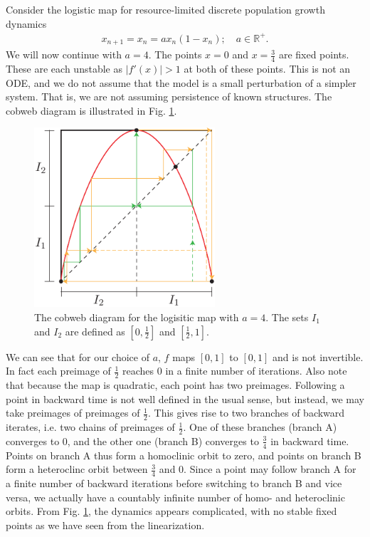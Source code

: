  \begin{ex}
 	Consider the logistic map for resource-limited discrete population growth dynamics
	\begin{align}
		x_{n+1}=x_{n}= ax_n(1-x_n);\quad a \in \mathbb{R}^{+}.
	\end{align}
	We will now continue with $a=4$. The points $x=0$ and $x=\frac{3}{4}$ are fixed points. These are each unstable as $|f'(x)|>1$ at both of these points. This is not an ODE, and we do not assume that the model is a small perturbation of a simpler system. That is, we are not assuming persistence of known structures. The cobweb diagram is illustrated in Fig. \ref{fig:logistic_cobweb}.
	\begin{figure}[h!]
		\centering
		\includegraphics[width=0.6\textwidth]{figures/ch6/23logistic_cobweb.pdf}
		\caption{The cobweb diagram for the logisitic map with $a=4$. The sets $I_1$ and $I_2$ are defined as $[0, \frac{1}{2}]$ and $[\frac{1}{2}, 1]$.}
		\label{fig:logistic_cobweb}
	\end{figure}
	We can see that for our choice of $a$, $f$ maps $[0,1]$ to $[0,1]$ and is not invertible. In fact each preimage of $\frac{1}{2}$ reaches $0$ in a finite number of iterations. Also note that because the map is quadratic, each point has two preimages. Following a point in backward time is not well defined in the usual sense, but instead, we may take preimages of preimages of $\frac{1}{2}$. This gives rise to two branches of backward iterates, i.e. two chains of preimages of $\frac{1}{2}$. One of these branches (branch A) converges to 0, and the other one (branch B) converges to $\frac{3}{4}$ in backward time. Points on branch A thus form a homoclinic orbit to zero, and points on branch B form a heteroclinc orbit between $\frac{3}{4}$ and $0$. Since a point may follow branch A for a finite number of backward iterations before switching to branch B and vice versa, we actually have a countably infinite number of homo- and heteroclinic orbits. From Fig. \ref{fig:logistic_cobweb}, the dynamics appears complicated, with no stable fixed points as we have seen from the linearization.


\end{ex}
